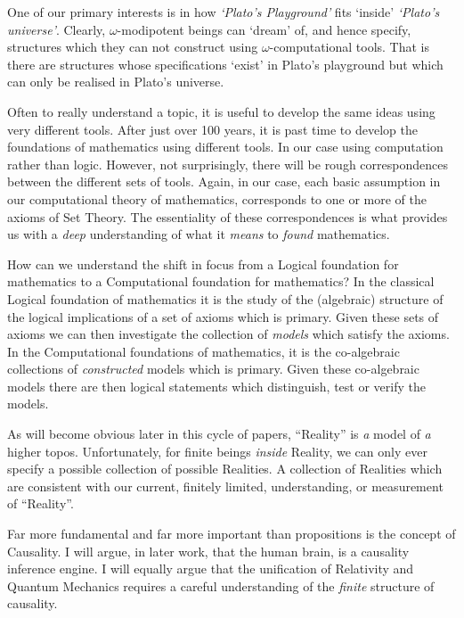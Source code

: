 \documentclass[a4paper,openany]{amsbook}
\begin{document}
One of our primary interests is in how \emph{`Plato's Playground'} fits `inside'
\emph{`Plato's universe'}. Clearly, $\omega$-modipotent beings can `dream' of,
and hence specify, structures which they can not construct using
$\omega$-computational tools. That is there are structures whose specifications
`exist' in Plato's playground but which can only be realised in Plato's
universe.

Often to really understand a topic, it is useful to develop the same ideas using very
different tools. After just over 100 years, it is past time to develop the foundations of
mathematics using different tools.  In our case using computation rather than logic.
However, not surprisingly, there will be rough correspondences between the different sets
of tools. Again, in our case, each basic assumption in our computational theory of
mathematics, corresponds to one or more of the axioms of Set Theory. The essentiality of
these correspondences is what provides us with a \emph{deep} understanding of what it
\emph{means} to \emph{found} mathematics.

How can we understand the shift in focus from a Logical foundation for
mathematics to a Computational foundation for mathematics? In the classical
Logical foundation of mathematics it is the study of the (algebraic) structure
of the logical implications of a set of axioms which is primary. Given these
sets of axioms we can then investigate the collection of \emph{models} which
satisfy the axioms. In the Computational foundations of mathematics, it is the
co-algebraic collections of \emph{constructed} models which is primary.  Given
these co-algebraic models there are then logical statements which distinguish,
test or verify the models.


As will become obvious later in this cycle of papers, ``Reality'' is \emph{a}
model of \emph{a} higher topos.  Unfortunately, for finite beings \emph{inside}
Reality, we can only ever specify a possible collection of possible Realities. A
collection of Realities which are consistent with our current, finitely limited,
understanding, or measurement of ``Reality''.

Far more fundamental and far more important than propositions is the concept of
Causality.  I will argue, in later work, that the human brain, is a causality
inference engine. I will equally argue that the unification of Relativity and
Quantum Mechanics requires a careful understanding of the \emph{finite}
structure of causality.
\end{document}

